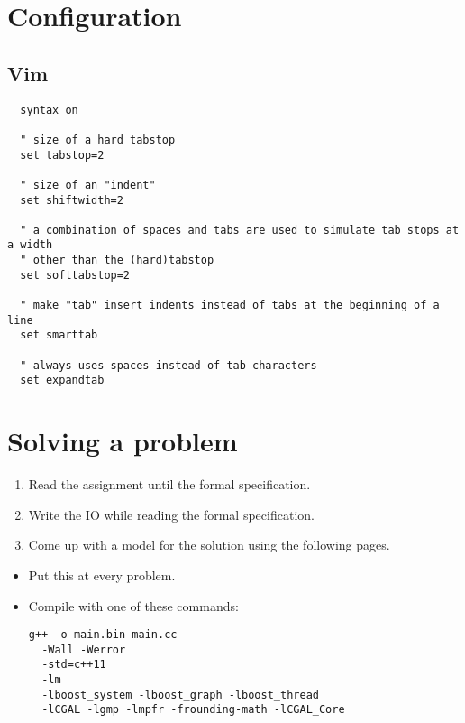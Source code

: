 \documentclass[guide.tex]{subfiles}
\begin{document}
\section{Configuration}

\subsection{Vim}

\begin{verbatim}
  syntax on

  " size of a hard tabstop
  set tabstop=2

  " size of an "indent"
  set shiftwidth=2

  " a combination of spaces and tabs are used to simulate tab stops at a width
  " other than the (hard)tabstop
  set softtabstop=2

  " make "tab" insert indents instead of tabs at the beginning of a line
  set smarttab

  " always uses spaces instead of tab characters
  set expandtab

\end{verbatim}


\section{Solving a problem}

{\Huge

\begin{enumerate}
  \item Read the assignment until the formal specification.
  \item Write the IO while reading the formal specification.
  \item Come up with a model for the solution using the following pages.
\end{enumerate}

}

\begin{itemize}
\item Put this at every problem.
  \newline {}
\item Compile with one of these commands:
  \newline {}
  \begin{verbatim}
g++ -o main.bin main.cc
  -Wall -Werror
  -std=c++11
  -lm
  -lboost_system -lboost_graph -lboost_thread
  -lCGAL -lgmp -lmpfr -frounding-math -lCGAL_Core
  \end{verbatim}
\end{itemize}
\pagebreak
\end{document}
